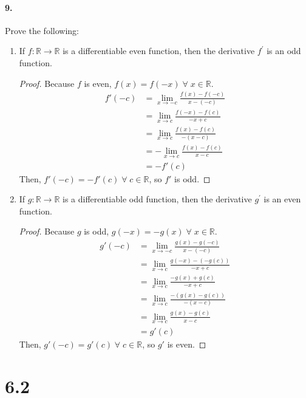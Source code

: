 \documentclass[12pt]{article}
\theoremstyle{remark}
\begin{document}
\paragraph{9.} Prove the following:
\begin{enumerate}[label=(\alph*)]
    \item If $f: \mathbb{R} \rightarrow \mathbb{R}$ is a differentiable even function, then the derivative $f^{\prime}$ is an odd function.
    \begin{proof}
        Because $f$ is even, $f(x) = f(-x) \;\forall\; x \in \mathbb{R}$.
        \begin{align*}
            f'(-c) &= \lim_{x \to -c} \frac{f(x) - f(-c)}{x - (-c)} \\
            &= \lim_{x \to c} \frac{f(-x) - f(c)}{-x + c} \\
            &= \lim_{x \to c} \frac{f(x) - f(c)}{-(x - c)} \\
            &= -\lim_{x \to c} \frac{f(x) - f(c)}{x - c} \\
            &= -f'(c)
        \end{align*}
        Then, $f'(-c) = -f'(c) \;\forall\; c \in \mathbb{R}$, so $f'$ is odd.
    \end{proof}
    
    \item If $g: \mathbb{R} \rightarrow \mathbb{R}$ is a differentiable odd function, then the derivative $g^{\prime}$ is an even function.
    \begin{proof}
        Because $g$ is odd, $g(-x) = -g(x) \;\forall\; x \in \mathbb{R}$.
        \begin{align*}
            g'(-c) &= \lim_{x \to -c} \frac{g(x) - g(-c)}{x - (-c)} \\
            &= \lim_{x \to c} \frac{g(-x) - (-g(c))}{-x + c} \\
            &= \lim_{x \to c} \frac{-g(x) + g(c)}{-x + c} \\
            &= \lim_{x \to c} \frac{-(g(x) - g(c))}{-(x - c)} \\
            &= \lim_{x \to c} \frac{g(x) - g(c)}{x - c} \\
            &= g'(c)
        \end{align*}
        Then, $g'(-c) = g'(c) \;\forall\; c \in \mathbb{R}$, so $g'$ is even.
    \end{proof}
\end{enumerate}

\section*{6.2}
\end{document}
